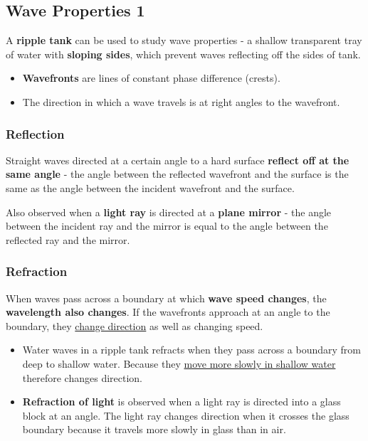\subsection{Wave Properties 1}

A \textbf{ripple tank} can be used to study wave properties - a shallow transparent tray of water with \textbf{sloping sides}, which prevent waves reflecting off the sides of tank.
\begin{itemize}
    \item \textbf{Wavefronts} are lines of constant phase difference (crests).
    \item The direction in which a wave travels is at right angles to the wavefront.
\end{itemize}

\subsubsection*{Reflection}
Straight waves directed at a certain angle to a hard surface \textbf{reflect off at the same angle} - the angle between the reflected wavefront and the surface is the same as the angle between the incident wavefront and the surface.

Also observed when a \textbf{light ray} is directed at a \textbf{plane mirror} - the angle between the incident ray and the mirror is equal to the angle between the reflected ray and the mirror.

\subsubsection*{Refraction}

When waves pass across a boundary at which \textbf{wave speed changes}, the \textbf{wavelength also changes}. If the wavefronts approach at an angle to the boundary, they \underline{change direction} as well as changing speed.
\begin{itemize}
    \item Water waves in a ripple tank refracts when they pass across a boundary from deep to shallow water. Because they \underline{move more slowly in shallow water} therefore changes direction.
    \item \textbf{Refraction of light} is observed when a light ray is directed into a glass block at an angle. The light ray changes direction when it crosses the glass boundary because it travels more slowly in glass than in air.
\end{itemize}

